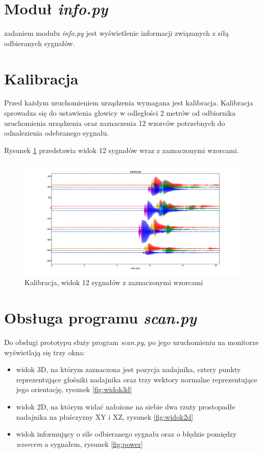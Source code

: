 \section{Moduł \textit{info.py}}

zadaniem modułu \textit{info.py} jest wyświetlenie informacji związanych z siłą odbieranych sygnałów.

\section{Kalibracja}

Przed każdym uruchomieniem urządzenia wymagana jest kalibracja.
Kalibracja sprowadza się do ustawienia głowicy w odległości 2 metrów od odbiornika
uruchomienia urządzenia oraz zaznaczenia 12 wzorców potrzebnych do odnalezienia 
odebranego sygnału.

Rysunek \ref{fig:kalibracja_12x} przedstawia widok 12 sygnałów wraz z zaznaczonymi wzorcami.


 \begin{figure}[h!]
    \centering
    \includegraphics[width=1.12\textwidth, trim= 46mm 0mm 0mm 0mm,clip]{kalibracja_12x}
    \caption{Kalibracja, widok 12 sygnałów z zaznaczonymi wzorcami}
    \label{fig:kalibracja_12x}
\end{figure}

\section{Obsługa programu \textit{scan.py}}

Do obsługi prototypu służy program \textit{scan.py}, po jego uruchomieniu 
na monitorze wyświetlają się trzy okna: 
\begin{itemize}
 \item widok 3D, na którym zaznaczona jest 
pozycja nadajnika, cztery punkty reprezentujące głośniki nadajnika oraz trzy wektory normalne reprezentujące 
jego orientację, rysunek \ref{fig:widok3d}
 \item widok 2D, na którym widać nałożone na siebie dwa rzuty prostopadłe nadajnika na płaśczyzny XY i XZ, rysunek \ref{fig:widok2d}
 \item widok informujący o sile odbieranego sygnału oraz o błędzie pomiędzy \textit{wzorcem} a sygnałem, rysunek \ref{fig:power}
\end{itemize}


